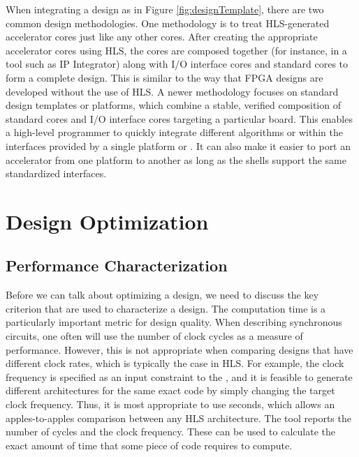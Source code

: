 When integrating a design as in Figure \ref{fig:designTemplate}, there are two common design methodologies.  One methodology is to treat HLS-generated accelerator cores just like any other cores.  After creating the appropriate accelerator cores using HLS, the cores are composed together (for instance, in a tool such as \vivado IP Integrator) along with I/O interface cores and standard cores to form a complete design.  This  is similar to the way that FPGA designs are developed without the use of HLS.  A newer methodology focuses on standard design templates or platforms, which combine a stable, verified composition of standard cores and I/O interface cores targeting a particular board. This  enables a high-level programmer to quickly integrate different algorithms or  within the interfaces provided by a single platform or .  It can also make it easier to port an accelerator from one platform to another as long as the shells support the same standardized interfaces.


\section{Design Optimization}
\label{sec:designOptimization}

\subsection{Performance Characterization}
\label{sec:designCharacterization}
Before we can talk about optimizing a design, we need to discuss the key criterion that are used to characterize a design.   The computation time is a particularly important metric for design quality.  When describing synchronous circuits, one often will use the number of clock cycles as a measure of performance.  However, this is not appropriate when comparing designs that have different clock rates, which is typically the case in HLS. For example, the clock frequency is specified as an input constraint to the \VHLS, and it is feasible to generate different architectures for the same exact code by simply changing the target clock frequency.  Thus, it is most appropriate to use seconds, which allows an apples-to-apples comparison between any HLS architecture. The \VHLS tool reports the number of cycles and the clock frequency. These can be used to calculate the exact amount of time that some piece of code requires to compute.

